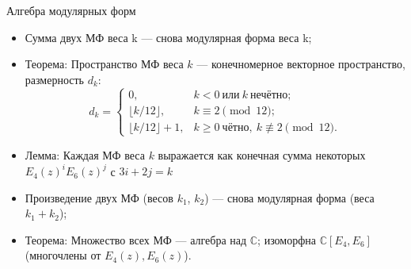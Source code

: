 \documentclass[serif, aspectratio=169]{beamer}
\begin{document}
\begin{frame}{Алгебра модулярных форм}
    \begin{itemize}
        \item Сумма двух МФ веса k --- снова модулярная форма веса k;
        \item Теорема: Пространство МФ веса $k$ --- конечномерное векторное пространство, размерность $d_k$:
        \[
        d_k = \begin{cases}
        0, & k<0\ \text{или}\ k\ \text{нечётно};\\
        \lfloor k/12\rfloor, & k\equiv2\!\!\!\pmod{12};\\
        \lfloor k/12\rfloor+1, & k\geq0\ \text{чётно},\ k\not\equiv2\!\!\!\pmod{12}.
        \end{cases}
        \]
        \item Лемма: Каждая МФ веса $k$ выражается как конечная сумма некоторых $E_4(z)^i E_6(z)^j$ с $3i+2j=k$
        \item Произведение двух МФ (весов $k_1$, $k_2$) --- снова модулярная форма (веса $k_1+k_2$);
        \item Теорема: Множество всех МФ --- алгебра над $\mathbb{C}$; изоморфна $\mathbb{C}[E_4,E_6]$ (многочлены от $E_4(z), E_6(z)$).
    \end{itemize}

\end{frame}
\end{document}
